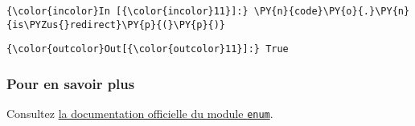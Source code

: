     \begin{Verbatim}[commandchars=\\\{\}]
{\color{incolor}In [{\color{incolor}11}]:} \PY{n}{code}\PY{o}{.}\PY{n}{is\PYZus{}redirect}\PY{p}{(}\PY{p}{)}
\end{Verbatim}


\begin{Verbatim}[commandchars=\\\{\}]
{\color{outcolor}Out[{\color{outcolor}11}]:} True
\end{Verbatim}
            
    \hypertarget{pour-en-savoir-plus}{%
\subsubsection{Pour en savoir plus}\label{pour-en-savoir-plus}}

Consultez \href{https://docs.python.org/3/library/enum.html}{la
documentation officielle du module \texttt{enum}}.